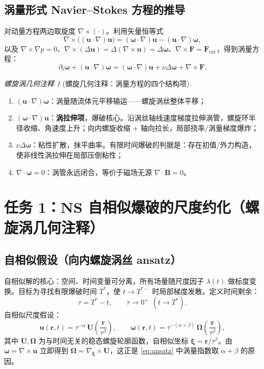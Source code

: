 \documentclass[11pt,a4paper]{article}
\newcommand{\bxi}{\bm{\xi}}
\newcommand{\bu}{\bm{u}}
\newcommand{\bU}{\bm{U}}
\newcommand{\bom}{\bm{\omega}}
\newcommand{\bOm}{\bm{\Omega}}
\newcommand{\bF}{\bm{F}}
\newcommand{\br}{\bm{r}}
\newcommand{\bB}{\bm{B}}
\theoremstyle{remark}
\newtheorem{remark}[theorem]{螺旋涡几何注释}
\begin{document}
\subsection{涡量形式 Navier--Stokes 方程的推导}

对动量方程两边取旋度 $\nabla\times(\cdot)$。利用矢量恒等式
\begin{equation}
\nabla\times\bigl((\bu\cdot\nabla)\bu\bigr)=(\bom\cdot\nabla)\bu-(\bu\cdot\nabla)\bom,
\end{equation}
以及 $\nabla\times\nabla p=0$、$\nabla\times(\Delta\bu)=\Delta(\nabla\times\bu)=\Delta\bom$、$\nabla\times\bF=\bF_{\mathrm{ext}}$，得到涡量方程：
\begin{equation}
\label{eq:vortns}
\partial_t\bom+(\bu\cdot\nabla)\bom=(\bom\cdot\nabla)\bu+\nu\Delta\bom+\nabla\times\bF.
\end{equation}

\begin{remark}[螺旋几何注释：涡量方程的四个结构项]
\begin{enumerate}[label=\arabic*.]
\item $(\bu\cdot\nabla)\bom$：涡量随流体元平移输运——螺旋涡丝整体平移；
\item $(\bom\cdot\nabla)\bu$：\textbf{涡拉伸项}，爆破核心。沿涡丝轴线速度梯度拉伸涡管，螺旋环半径收缩、角速度上升；向内螺旋收缩 $+$ 轴向拉长，局部挠率/涡量梯度爆炸；
\item $\nu\Delta\bom$：粘性扩散，抹平曲率。有限时间爆破的判据是：存在初值/外力构造，使非线性涡拉伸在局部压倒粘性；
\item $\nabla\cdot\bom=0$：涡管永远闭合，等价于磁场无源 $\nabla\cdot\bB=0$。
\end{enumerate}
\end{remark}

\section{任务 1：NS 自相似爆破的尺度约化（螺旋涡几何注释）}

\subsection{自相似假设（向内螺旋涡丝 ansatz）}

自相似解的核心：空间、时间变量可分离，所有场量随尺度因子 $\lambda(t)$ 做标度变换。目标为寻找有限爆破时间 $T^*$，使 $t\to T^{*-}$ 时局部梯度发散。定义时间剩余：
\begin{equation}
\tau=T^*-t,\qquad \tau\to0^{+}\ \ (t\to T^{*}).
\end{equation}
自相似尺度假设：
\begin{equation}
\label{eq:ansatz}
\bu(\br,t)=\tau^{-\alpha}\,\bU\!\left(\frac{\br}{\tau^{\beta}}\right),\qquad
\bom(\br,t)=\tau^{-(\alpha+\beta)}\,\bOm\!\left(\frac{\br}{\tau^{\beta}}\right),
\end{equation}
其中 $\bU,\bOm$ 为与时间无关的稳态螺旋轮廓函数，自相似坐标 $\bxi=\br/\tau^{\beta}$。由 $\bom=\nabla\times\bu$ 立即得到 $\bOm=\nabla_{\bxi}\times\bU$，这正是 \eqref{eq:ansatz} 中涡量指数取 $\alpha+\beta$ 的原因。
\end{document}
